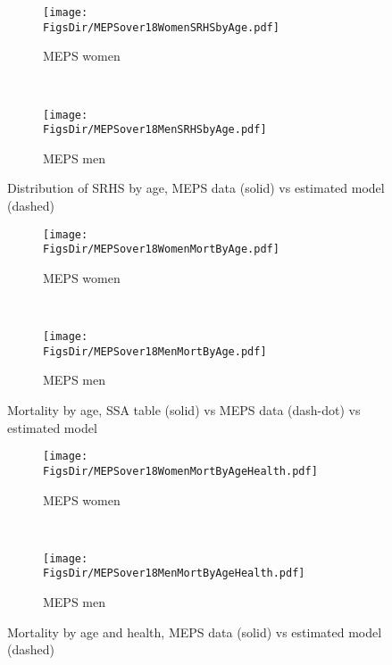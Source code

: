 \documentclass[12pt,pdftex,letterpaper]{article}
\newcommand{\RootDir}{..}
\newcommand{\FigsDir}{\RootDir/Figures}
\begin{document}
\begin{figure}[H]
	\centering
	\begin{subfigure}[b]{0.48\textwidth}
	\texttt{[image: \\FigsDir/MEPSover18WomenSRHSbyAge.pdf]}
	\caption{MEPS women}\label{fig:MEPSwomenSRHSfit}
	\end{subfigure}
    ~
    \begin{subfigure}[b]{0.48\textwidth}
    	\texttt{[image: \\FigsDir/MEPSover18MenSRHSbyAge.pdf]}
    	\caption{MEPS men}\label{fig:MEPSmenSRHSfit}
    \end{subfigure}
    \caption{Distribution of SRHS by age, MEPS data (solid) vs estimated model (dashed)}\label{fig:SRHSfitMEPS}
\end{figure}


\begin{figure}[H]
	\centering
	\begin{subfigure}[b]{0.48\textwidth}
		\texttt{[image: \\FigsDir/MEPSover18WomenMortByAge.pdf]}
		\caption{MEPS women}\label{fig:MEPSwomenMortFit}
	\end{subfigure}
	~
	\centering
	\begin{subfigure}[b]{0.48\textwidth}
		\texttt{[image: \\FigsDir/MEPSover18MenMortByAge.pdf]}
		\caption{MEPS men}\label{fig:MEPSmenMortFit}
	\end{subfigure}
	\caption{Mortality by age, SSA table (solid) vs MEPS data (dash-dot) vs estimated model} \label{fig:MortFitMEPS}
\end{figure}


\begin{figure}[H]
	\centering
	\begin{subfigure}[b]{0.48\textwidth}
		\texttt{[image: \\FigsDir/MEPSover18WomenMortByAgeHealth.pdf]}
		\caption{MEPS women}\label{fig:MEPSwomenMortHealthFit}
	\end{subfigure}
	~
	\centering
	\begin{subfigure}[b]{0.48\textwidth}
		\texttt{[image: \\FigsDir/MEPSover18MenMortByAgeHealth.pdf]}
		\caption{MEPS men}\label{fig:MEPSmenMortHealthFit}
	\end{subfigure}
	\caption{Mortality by age and health, MEPS data (solid) vs estimated model (dashed)} \label{fig:MortFitByHealthMEPS}
\end{figure}

\newpage
\end{document}
